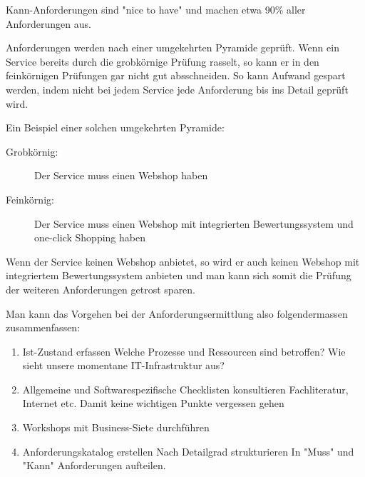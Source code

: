 \documentclass[a4paper, 11pt]{article}
\begin{document}
Kann-Anforderungen sind "nice to have" und machen etwa 90\% aller Anforderungen aus.
\vspace{10px}

\noindent Anforderungen werden nach einer umgekehrten Pyramide geprüft. Wenn ein Service bereits durch die grobkörnige Prüfung rasselt, so kann er in den feinkörnigen Prüfungen gar nicht gut absschneiden. So kann Aufwand gespart werden, indem nicht bei jedem Service jede Anforderung bis ins Detail geprüft wird.

Ein Beispiel einer solchen umgekehrten Pyramide:

\begin{description}
	\item[Grobkörnig: ] Der Service muss einen Webshop haben
	\item[Feinkörnig: ] Der Service muss einen Webshop mit integrierten Bewertungssystem und one-click Shopping haben 
\end{description} 

Wenn der Service keinen Webshop anbietet, so wird er auch keinen Webshop mit integriertem Bewertungssystem anbieten und man kann sich somit die Prüfung der weiteren Anforderungen getrost sparen.

\newpage

\noindent Man kann das Vorgehen bei der Anforderungsermittlung also folgendermassen zusammenfassen:

\begin{enumerate}
	\item Ist-Zustand erfassen
		\subitem Welche Prozesse und Ressourcen sind betroffen?
		\subitem Wie sieht unsere momentane IT-Infrastruktur aus?
	\item Allgemeine und Softwarespezifische Checklisten konsultieren
		\subitem Fachliteratur, Internet etc.
		\subitem Damit keine wichtigen Punkte vergessen gehen
	\item Workshops mit Business-Siete durchführen
	\item Anforderungskatalog erstellen
		\subitem Nach Detailgrad strukturieren
		\subitem In "Muss" und "Kann" Anforderungen aufteilen.
\end{enumerate}
\end{document}
